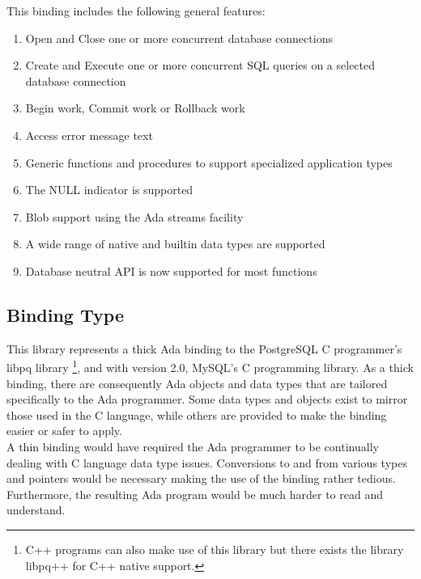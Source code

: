 \documentclass[english,letterpaper]{book}
\begin{document}
This binding includes the following general features:

\begin{enumerate}
   \item Open and Close one or more concurrent database connections
   \item Create and Execute one or more concurrent SQL queries on a selected
         database connection
   \item Begin work, Commit work or Rollback work
   \item Access error message text
   \item Generic functions and procedures to support specialized application
         types
   \item The NULL indicator is supported
   \item Blob support using the Ada streams facility
   \item A wide range of native and builtin data types are supported
   \item Database neutral API is now supported for most functions
\end{enumerate}

\subsection{Binding Type}

This library represents a thick Ada binding to the PostgreSQL C  programmer's
libpq library %
\footnote{C++ programs can also make use of this library but there exists the
library libpq++ for C++ native support.%
}, and with version 2.0, MySQL's C programming library. As a thick
binding, there are consequently Ada objects and data types that are
tailored specifically to the Ada programmer. Some data types and objects
exist to mirror those used in the C language, while others are provided
to make the binding easier or safer to apply.\\

A thin binding would have required the Ada programmer to be continually
dealing with C language data type issues. Conversions to and from
various types and pointers would be necessary making the use of the
binding rather tedious. Furthermore, the resulting Ada program would
be much harder to read and understand.\\
\end{document}
